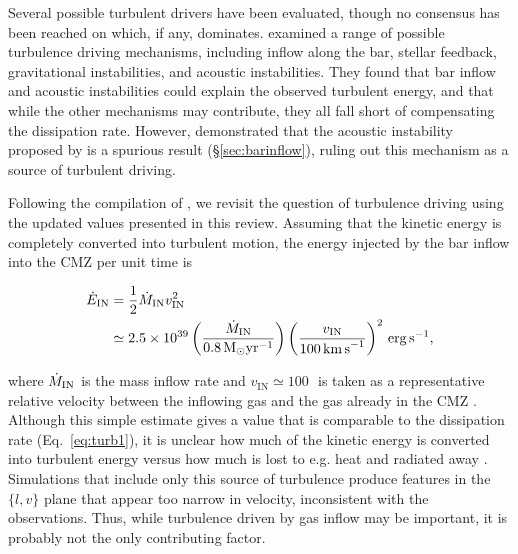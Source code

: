 Several possible turbulent drivers have been evaluated, though no consensus has been reached on which, if any, dominates.
\cite{Kruijssen2014a} examined a range of possible turbulence driving mechanisms, including inflow along the bar, stellar feedback, gravitational instabilities, and acoustic instabilities. 
They found that bar inflow and acoustic instabilities could explain the observed turbulent energy, and that while the other mechanisms may contribute, they all fall short of compensating the dissipation rate.
However, \cite{Sormani2020c} demonstrated that the acoustic instability proposed by \citet{Montenegro1999} is a spurious result (\S\ref{sec:barinflow}), ruling out this mechanism as a source of turbulent driving.

Following the compilation of \citet[][and \citealp{MacLow2004}]{Kruijssen2014a}, we revisit the question of turbulence driving using the updated values presented in this review. 
Assuming that the kinetic energy is completely converted into turbulent motion, the energy injected by the bar inflow into the CMZ per unit time is

\setlength{\mathindent}{0pt}
\begin{footnotesize}
\begin{align}
    \dot{E}_\mathrm{IN} & =\frac{1}{2}\dot{M}_{\rm IN} v_{\rm IN}^2 \nonumber \\
    & \simeq 2.5\times 10^{39}\left(\frac{\dot{M}_{\rm IN}}{0.8\,\mathrm{M}_\odot\mathrm{yr}^{-1}}\right)\left(\frac{v_\mathrm{IN}}{100\,\mathrm{km\,s}^{-1}}\right)^{2}\, \mathrm{erg\,s^{-1}},
\end{align}

\end{footnotesize}
% 
where $\dot{M}_{\rm IN}$ is the mass inflow rate and $v_\mathrm{IN}\simeq100$\,\kms \ is taken as a representative relative velocity between the inflowing gas and the gas already in the CMZ \citep[e.g.][]{Sormani2019b}. Although this simple estimate gives a value that is comparable to the dissipation rate (Eq.~\ref{eq:turb1}), it is unclear how much of the kinetic energy is converted into turbulent energy versus how much is lost to e.g. heat and radiated away \citep{Klessen2010}. Simulations that include only this source of turbulence \citep[e.g.][]{Sormani2019a} produce features in the $\{l,v\}$ plane that appear too narrow in velocity, inconsistent with the observations.
Thus, while turbulence driven by gas inflow may be important, it is probably not the only contributing factor.

